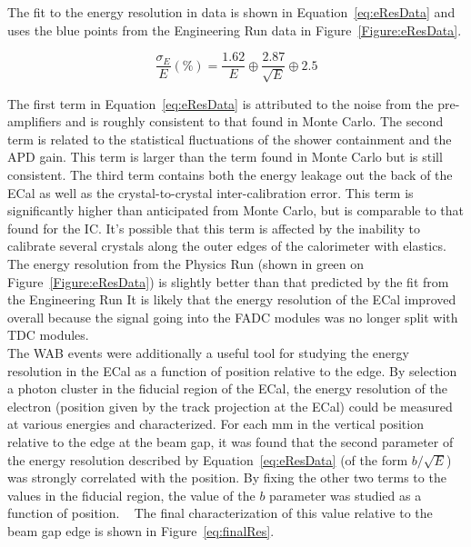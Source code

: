 The fit to the energy resolution in data is shown in Equation~\eqref{eq:eResData} and uses the blue points from the Engineering Run data in Figure~\ref{Figure:eResData}.

\begin{equation}
	\label{eq:eResData}
	\dfrac{\sigma_E}{E}(\%) = \dfrac{1.62}{E}\oplus\dfrac{2.87}{\sqrt{E}}\oplus2.5
\end{equation}

The first term in Equation~\eqref{eq:eResData} is attributed to the noise from the pre-amplifiers and is roughly consistent to that found in Monte Carlo. The second term is related to the statistical fluctuations of the shower containment and the APD gain. This term is larger than the term found in Monte Carlo but is still consistent. The third term contains both the energy leakage out the back of the ECal as well as the crystal-to-crystal inter-calibration error. This term is significantly higher than anticipated from Monte Carlo, but is comparable to that found for the IC. It's possible that this term is affected by the inability to calibrate several crystals along the outer edges of the calorimeter with elastics. \\
\indent The energy resolution from the Physics Run (shown in green on Figure~\ref{Figure:eResData}) is slightly better than that predicted by the fit from the Engineering Run It is likely that the energy resolution of the ECal improved overall because the signal going into the FADC modules was no longer split with TDC modules. \\
\indent The WAB events were additionally a useful tool for studying the energy resolution in the ECal as a function of position relative to the edge. By selection a photon cluster in the fiducial region of the ECal, the energy resolution of the electron (position given by the track projection at the ECal) could be measured at various energies and characterized. For each mm in the vertical position relative to the edge at the beam gap, it was found that the second parameter of the energy resolution described by Equation~\eqref{eq:eResData} (of the form $b/\sqrt{E}$) was strongly correlated with the position. By fixing the other two terms to the values in the fiducial region, the value of the $b$ parameter was studied as a function of position. ~\cite{szumila-vance_hps_2016} The final characterization of this value relative to the beam gap edge is shown in Figure~\ref{eq:finalRes}.~\cite{balossino_hps_2016}

